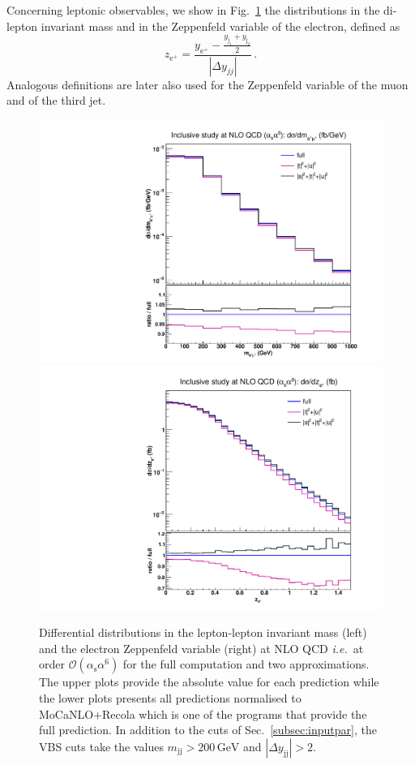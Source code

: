 \documentclass[twocolumn,epjc3]{svjour3} %
\newcommand{\Pj}{\ensuremath{\text{j}}\xspace}
\newcommand{\Pe}{\ensuremath{\text{e}}\xspace}
\newcommand{\GeV}{\ensuremath{\,\text{GeV}}\xspace}
\newcommand{\alphas}{\ensuremath{\alpha_\text{s}}\xspace}
\begin{document}
    Concerning leptonic observables, we show in Fig.~\ref{fig:mjjdyjj_1d_3} the distributions in the di-lepton invariant mass and in the Zeppenfeld variable of the electron, defined as
    \begin{equation}
      z_{\Pe^+} = \frac{y_{\Pe^+}-\frac{y_{\Pj_1}+y_{\Pj_2}}2}{|\Delta y_{jj}|} \,.
      \label{eq:Zeppenfeld}
    \end{equation}
    Analogous definitions are later also used for the Zeppenfeld variable of the muon and of the third jet.
    \begin{figure}
    \centering
    {\includegraphics[scale=0.35]{figures/scanfigures/mll_nlo.pdf}}
    {\includegraphics[scale=0.35]{figures/scanfigures/zel_nlo.pdf}}
    \caption{Differential distributions in the lepton-lepton invariant mass (left) and the electron Zeppenfeld variable (right) at NLO QCD \emph{i.e.}\ at order $\mathcal{O}(\alphas\alpha^6)$ for the full computation and two approximations.
    The upper plots provide the absolute value for each prediction while the lower plots presents all predictions normalised to {\sc MoCaNLO}+{\sc Recola} which is one of the programs that provide the full prediction.
    In addition to the cuts of Sec.~\protect\ref{subsec:inputpar}, the VBS cuts take the values $m_{\Pj\Pj}>200 \GeV$ and $|\Delta y_{\Pj\Pj}|>2$.} 
    \label{fig:mjjdyjj_1d_3}
    \end{figure}
\end{document}
